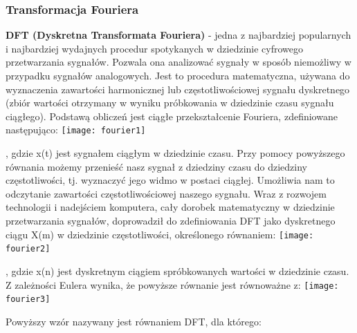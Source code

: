 \documentclass[a4paper,titleauthor]{mwart}
\begin{document}
	\subsubsection{Transformacja Fouriera}
	
	\textbf{DFT (Dyskretna Transformata Fouriera)} - jedna z najbardziej popularnych i najbardziej wydajnych procedur spotykanych w dziedzinie cyfrowego przetwarzania sygnałów.\newline \newline
	Pozwala ona analizować sygnały w sposób niemożliwy w przypadku sygnałów analogowych. Jest to procedura matematyczna, używana do wyznaczenia zawartości harmonicznej lub częstotliwościowej sygnału dyskretnego (zbiór wartości otrzymany w wyniku próbkowania w dziedzinie czasu sygnału ciągłego).\newline \newline
	Podstawą obliczeń jest ciągłe przekształcenie Fouriera, zdefiniowane następująco:\newline
	\texttt{[image: fourier1]}
	
	, gdzie x(t) jest sygnałem ciągłym w dziedzinie czasu.\newline\newline
	Przy pomocy powyższego równania możemy przenieść nasz sygnał z dziedziny czasu do dziedziny częstotliwości, tj. wyznaczyć jego widmo w postaci ciągłej. Umożliwia nam to odczytanie zawartości częstotliwościowej naszego sygnału.
	\newline\newline
	Wraz z rozwojem technologii i nadejściem komputera, cały dorobek matematyczny w dziedzinie przetwarzania sygnałów, doprowadził do zdefiniowania DFT jako dyskretnego ciągu X(m) w dziedzinie częstotliwości, określonego równaniem:
	\newline
	\texttt{[image: fourier2]}
	
	, gdzie x(n) jest dyskretnym ciągiem spróbkowanych wartości w dziedzinie czasu. \newline\newline
	Z zależności Eulera wynika, że powyższe równanie jest równoważne z: 
	\newline
	\texttt{[image: fourier3]}
	
	Powyższy wzór nazywany jest równaniem DFT, dla którego:
	
\end{document}
